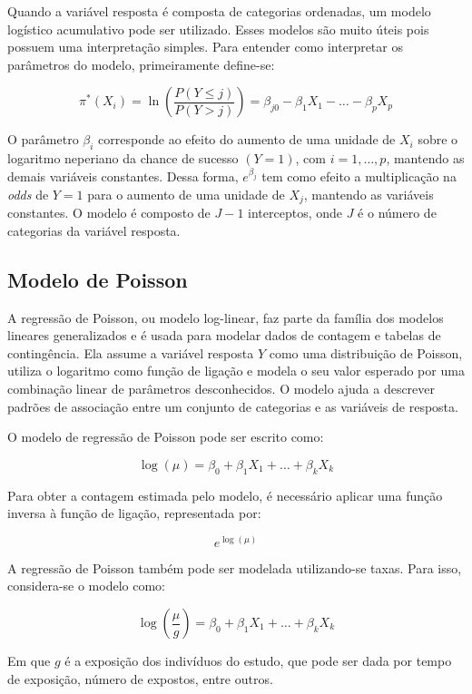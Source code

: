 \documentclass[
  portuguese,
]{estat/estat}
\begin{document}
Quando a variável resposta é composta de categorias ordenadas, um modelo
logístico acumulativo pode ser utilizado. Esses modelos são muito úteis
pois possuem uma interpretação simples. Para entender como interpretar
os parâmetros do modelo, primeiramente define-se:

\[
\pi^*(X_i) = \ln\left(\frac{P(Y \le j)}{P(Y > j)}\right) = \beta_{j0} - \beta_1 X_1 - \ldots - \beta_p X_p
\]

O parâmetro \(\beta_{i}\) corresponde ao efeito do aumento de uma
unidade de \(X_{i}\) sobre o logaritmo neperiano da chance de sucesso
\((Y=1)\), com \(i=1, \ldots, p\), mantendo as demais variáveis
constantes. Dessa forma, \(\displaystyle e^{\beta_j}\) tem como efeito a
multiplicação na \emph{odds} de \(Y=1\) para o aumento de uma unidade de
\(X_{j}\), mantendo as variáveis constantes. O modelo é composto de
\(J-1\) interceptos, onde \(J\) é o número de categorias da variável
resposta.

\subsection{Modelo de Poisson}\label{modelo-de-poisson}

A regressão de Poisson, ou modelo log-linear, faz parte da família dos
modelos lineares generalizados e é usada para modelar dados de contagem
e tabelas de contingência. Ela assume a variável resposta \(Y\) como uma
distribuição de Poisson, utiliza o logaritmo como função de ligação e
modela o seu valor esperado por uma combinação linear de parâmetros
desconhecidos. O modelo ajuda a descrever padrões de associação entre um
conjunto de categorias e as variáveis de resposta.

O modelo de regressão de Poisson pode ser escrito como:

\[
\log(\mu) = \beta_0 + \beta_1 X_1 + \ldots + \beta_k X_k
\]

Para obter a contagem estimada pelo modelo, é necessário aplicar uma
função inversa à função de ligação, representada por:

\[
e^{\log(\mu)}
\]

A regressão de Poisson também pode ser modelada utilizando-se taxas.
Para isso, considera-se o modelo como:

\[
\log\left(\frac{\mu}{g}\right) = \beta_0 + \beta_1 X_1 + \ldots + \beta_k X_k
\]

Em que \(g\) é a exposição dos indivíduos do estudo, que pode ser dada
por tempo de exposição, número de expostos, entre outros.
\end{document}
